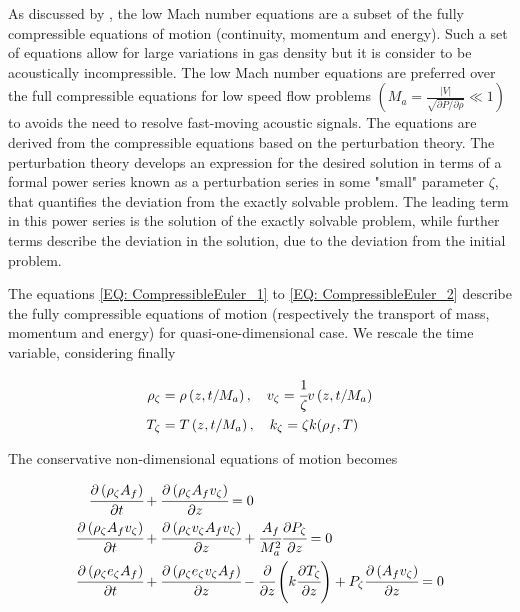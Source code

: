 \documentclass[../Article_Model_Parameters.tex]{subfiles}
\begin{document}
	
	As discussed by \citet{Lions2013}, the low Mach number equations are a subset of the fully compressible equations of motion (continuity, momentum and energy). Such a set of equations allow for large variations in gas density but it is consider to be acoustically incompressible. The low Mach number equations are preferred over the full compressible equations for low speed flow problems $\left( M_a = \frac{|V|}{\sqrt{ \partial P / \partial \rho }} \ll 1 \right)$ to avoids the need to resolve fast-moving acoustic signals. The equations are derived from the compressible equations based on the perturbation theory. The perturbation theory develops an expression for the desired solution in terms of a formal power series known as a perturbation series in some "small" parameter $\zeta$, that quantifies the deviation from the exactly solvable problem. The leading term in this power series is the solution of the exactly solvable problem, while further terms describe the deviation in the solution, due to the deviation from the initial problem. 
	
	The equations \ref{EQ: CompressibleEuler_1} to \ref{EQ: CompressibleEuler_2} describe the fully compressible equations of motion (respectively the transport of mass, momentum and energy) for quasi-one-dimensional case. We rescale the time variable, considering finally 
	
	{\footnotesize
		\begin{align*}
			\rho_\zeta 	&= \rho\left( z, t/M_a \right), \quad
			v_\zeta 	= \cfrac{1}{\zeta} v\left( z, t/M_a \right) \\ 
			T_\zeta 	&= T\left( z, t/M_a \right),  \quad 
			k_\zeta 	= \zeta k(\rho_f, T) 
		\end{align*} 
	}
	
	The conservative non-dimensional equations of motion becomes
	
	{\footnotesize
		\begin{align*}
			\cfrac{\partial \left( \rho_\zeta A_f \right)}{\partial t} &+ \cfrac{\partial \left( \rho_\zeta A_f v_\zeta \right)}{\partial z} = 0 \\
			\cfrac{\partial \left( \rho_\zeta A_f v_\zeta \right) }{\partial t}	&+ \cfrac{\partial \left( \rho_\zeta v_\zeta A_f v_\zeta \right)}{\partial z} + \cfrac{A_f}{M_a^2} \cfrac{\partial P_\zeta}{\partial z} = 0\\
			\cfrac{\partial \left( \rho_\zeta e_\zeta A_f \right) }{\partial t} &+ \cfrac{\partial \left( \rho_\zeta e_\zeta v_\zeta A_f \right)}{\partial z} - \cfrac{\partial}{\partial z} \left( k \cfrac{\partial T_\zeta}{\partial z} \right) + P_\zeta \cfrac{\partial \left(A_f v_\zeta\right)}{\partial z} = 0
		\end{align*}
	}
\end{document}

